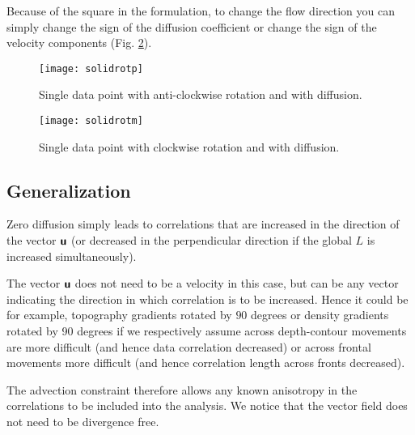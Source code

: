 Because of the square in the formulation, to change the flow direction 
you can simply change the sign of the diffusion coefficient or change 
the sign of the velocity components (Fig. \ref{fig:solidrotm}).

\begin{figure}[htpb]
\parbox{.6\textwidth}{
\texttt{[image: solidrotp]}
}\parbox{.4\textwidth}{
\caption{Single data point with anti-clockwise rotation and with diffusion. \label{fig:solidrotp}}
}
\end{figure}

\begin{figure}[htpb]
\centering
\parbox{.6\textwidth}{
\texttt{[image: solidrotm]}
}\parbox{.4\textwidth}{
\caption{Single data point with clockwise rotation and with diffusion. \label{fig:solidrotm}}
}
\end{figure}


\subsection{Generalization}

Zero diffusion simply leads to correlations that are increased in the 
direction of the vector $\mbox{\boldmath $ \protect\mathsf{u} $}$ (or decreased in the perpendicular 
direction if the global $L$ is increased simultaneously). 

The vector $\mbox{\boldmath $ \protect\mathsf{u} $}$ does not need to be a velocity in this case, but can be any 
vector indicating the direction in which correlation is to be increased.
Hence it could be for example, topography gradients rotated by $90$ degrees 
or density gradients rotated by 90 degrees if we respectively assume across depth-contour movements are more 
difficult (and hence data correlation decreased) or across frontal movements more difficult (and hence correlation length 
across fronts decreased).

The advection constraint therefore allows any known anisotropy in the correlations to be included into the analysis. We notice that the vector field does not need to be divergence free.



